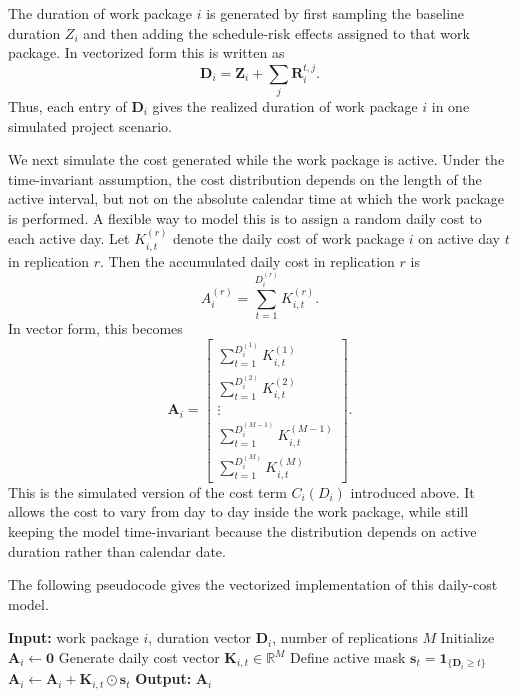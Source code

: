 \documentclass[11pt,a4paper]{article}
\newcommand{\1}{\mathbf{1}}
\theoremstyle{definition}
\theoremstyle{plain}
\theoremstyle{remark}
\numberwithin{equation}{section}
\begin{document}
The duration of work package $i$ is generated by first sampling the baseline duration $Z_i$ and then adding the schedule-risk effects assigned to that work package. In vectorized form this is written as
\[
\mathbf{D}_i
=
\mathbf{Z}_i
+
\sum_j \mathbf{R}_i^{t,j}.
\]
Thus, each entry of $\mathbf{D}_i$ gives the realized duration of work package $i$ in one simulated project scenario.

We next simulate the cost generated while the work package is active. Under the time-invariant assumption, the cost distribution depends on the length of the active interval, but not on the absolute calendar time at which the work package is performed. A flexible way to model this is to assign a random daily cost to each active day. Let $K_{i,t}^{(r)}$ denote the daily cost of work package $i$ on active day $t$ in replication $r$. Then the accumulated daily cost in replication $r$ is
\[
A_i^{(r)}
=
\sum_{t=1}^{D_i^{(r)}} K_{i,t}^{(r)}.
\]
In vector form, this becomes
\[
\mathbf{A}_i
=
\begin{bmatrix}
\sum_{t=1}^{D_i^{(1)}} K_{i,t}^{(1)}\\
\sum_{t=1}^{D_i^{(2)}} K_{i,t}^{(2)}\\
\vdots\\
\sum_{t=1}^{D_i^{(M-1)}} K_{i,t}^{(M-1)}\\
\sum_{t=1}^{D_i^{(M)}} K_{i,t}^{(M)}
\end{bmatrix}.
\]
This is the simulated version of the cost term $C_i(D_i)$ introduced above. It allows the cost to vary from day to day inside the work package, while still keeping the model time-invariant because the distribution depends on active duration rather than calendar date.

The following pseudocode gives the vectorized implementation of this daily-cost model.

\begin{algorithm}[H]
\caption{Simulating accumulated daily cost $\mathbf{A}_i$ for work package $i$}
\label{alg:mc-accumulated-cost-daily}
\begin{algorithmic}[1]
\State \textbf{Input:} work package $i$, duration vector $\mathbf{D}_i$, number of replications $M$
\State Initialize $\mathbf{A}_i \leftarrow \mathbf{0}$ 
    \State Generate daily cost vector $\mathbf{K}_{i,t}\in\mathbb{R}^M$
    \State Define active mask $\mathbf{s}_t=\mathbf{1}_{\{\mathbf{D}_i\geq t\}}$
    \State $\mathbf{A}_i \leftarrow \mathbf{A}_i+\mathbf{K}_{i,t}\odot \mathbf{s}_t$
\EndFor
\State \textbf{Output:} $\mathbf{A}_i$
\end{algorithmic}
\end{algorithm}
\end{document}
